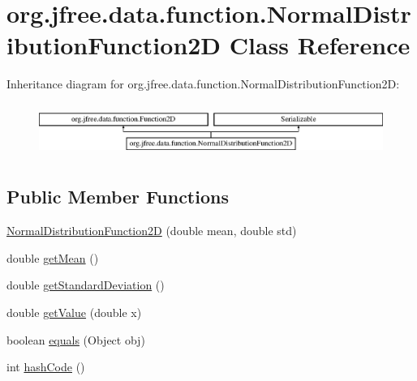 \hypertarget{classorg_1_1jfree_1_1data_1_1function_1_1_normal_distribution_function2_d}{}\section{org.\+jfree.\+data.\+function.\+Normal\+Distribution\+Function2D Class Reference}
\label{classorg_1_1jfree_1_1data_1_1function_1_1_normal_distribution_function2_d}
Inheritance diagram for org.\+jfree.\+data.\+function.\+Normal\+Distribution\+Function2D\+:\begin{figure}[H]
\begin{center}
\leavevmode
\includegraphics[height=1.761006cm]{classorg_1_1jfree_1_1data_1_1function_1_1_normal_distribution_function2_d}
\end{center}
\end{figure}
\subsection*{Public Member Functions}
\begin{DoxyCompactItemize}
\item 
\mbox{\hyperlink{classorg_1_1jfree_1_1data_1_1function_1_1_normal_distribution_function2_d_a81d49575f6b06b815765b558f226790b}{Normal\+Distribution\+Function2D}} (double mean, double std)
\item 
double \mbox{\hyperlink{classorg_1_1jfree_1_1data_1_1function_1_1_normal_distribution_function2_d_ad4fda9d95bf48004845ee61a81e69c64}{get\+Mean}} ()
\item 
double \mbox{\hyperlink{classorg_1_1jfree_1_1data_1_1function_1_1_normal_distribution_function2_d_a83648319c1a16057afd875e3a5b9735e}{get\+Standard\+Deviation}} ()
\item 
double \mbox{\hyperlink{classorg_1_1jfree_1_1data_1_1function_1_1_normal_distribution_function2_d_ae9a646904dcbaaa779ee1426612613dd}{get\+Value}} (double x)
\item 
boolean \mbox{\hyperlink{classorg_1_1jfree_1_1data_1_1function_1_1_normal_distribution_function2_d_a0fa91592827ec436c7b1f13cc42355b6}{equals}} (Object obj)
\item 
int \mbox{\hyperlink{classorg_1_1jfree_1_1data_1_1function_1_1_normal_distribution_function2_d_a2d8b1c62d83d213ed18baa6eaf96b1df}{hash\+Code}} ()
\end{DoxyCompactItemize}


